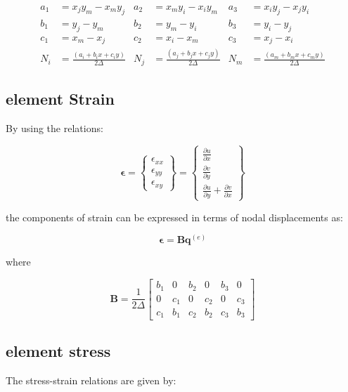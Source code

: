 \begin{align*}
	a_1 &= x_j y_m - x_m y_j & a_2 &= x_m y_i - x_i y_m & a_3 &= x_i y_j - x_j y_i \\
	b_1 &= y_j - y_m & b_2 &= y_m - y_i & b_3 &= y_i - y_j \\
	c_1 &= x_m - x_j & c_2 &= x_i - x_m & c_3 &= x_j - x_i \\
	N_i &= \frac{( a_i + b_i x + c_i y)}{2\Delta} & N_j &= \frac{( a_j + b_j x + c_j y)}{2\Delta} & N_m &= \frac{( a_m + b_m x + c_m y)}{2\Delta}
\end{align*}

\subsection{element Strain}
By using the relations:

\begin{equation}
\mathbf{\epsilon} = \left\lbrace \begin{array}{c}
\epsilon_{xx} \\ 
\epsilon_{yy} \\ 
\epsilon_{xy}
\end{array} \right\rbrace = \left\lbrace \begin{array}{c}
\frac{\partial u}{\partial x} \\ 
\frac{\partial v}{\partial y} \\ 
\frac{\partial u}{\partial y}+\frac{\partial v}{\partial x}
\end{array}  \right\rbrace 
\end{equation}

the components of strain can be expressed in terms of nodal displacements as:

\begin{equation}
\mathbf{\epsilon} = \mathbf{B} \mathbf{q}^{(e)}
\end{equation}

where

\begin{equation}\label{eq: stain matrix}
\mathbf{B} = \frac{1}{2\Delta} \begin{bmatrix}
b_1 & 0 & b_2 & 0 & b_3 & 0 \\ 
0 & c_1 & 0 & c_2 & 0 & c_3 \\ 
c_1 & b_1 & c_2 & b_2 & c_3 & b_3
\end{bmatrix} 
\end{equation}

\subsection{element stress}
The stress-strain relations are given by:

